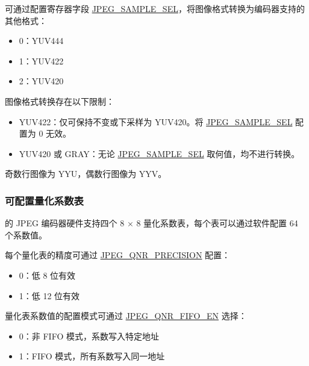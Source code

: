 \documentclass[main\_\_CN.tex]{subfiles}
\begin{document}
\begin{table}[H]
\begin{threeparttable}
    \begin{tablenotes}
        \item[1] 可通过配置寄存器字段 \hyperref[fielddesc:JPEGSAMPLESEL]{JPEG\_SAMPLE\_SEL}，将图像格式转换为编码器支持的其他格式：
        \begin{itemize}
            \item 0：YUV444
            \item 1：YUV422
            \item 2：YUV420
        \end{itemize}
        \item[2] 图像格式转换存在以下限制：
        \begin{itemize}
            \item YUV422：仅可保持不变或下采样为 YUV420。将 \hyperref[fielddesc:JPEGSAMPLESEL]{JPEG\_SAMPLE\_SEL} 配置为 0 无效。
            \item YUV420 或 GRAY：无论 \hyperref[fielddesc:JPEGSAMPLESEL]{JPEG\_SAMPLE\_SEL} 取何值，均不进行转换。
        \end{itemize}
        \item[3] 奇数行图像为 YYU，偶数行图像为 YYV。
    \end{tablenotes}

    \end{threeparttable}
\end{table}


\subsubsection{可配置量化系数表}
\label{sec:jpegcodec-enc-qnr}

\chipname{} 的 JPEG 编码器硬件支持四个 8 × 8 量化系数表，每个表可以通过软件配置 64 个系数值。

每个量化表的精度可通过 \hyperref[fielddesc:JPEGQNRPRECISION]{JPEG\_QNR\_PRECISION} 配置：
\begin{itemize}
\item 0：低 8 位有效
\item 1：低 12 位有效
\end{itemize}

量化表系数值的配置模式可通过 \hyperref[fielddesc:JPEGQNRFIFOEN]{JPEG\_QNR\_FIFO\_EN} 选择：
\begin{itemize}
\item 0：非 FIFO 模式，系数写入特定地址
\item 1：FIFO 模式，所有系数写入同一地址
\end{itemize}
\end{document}
